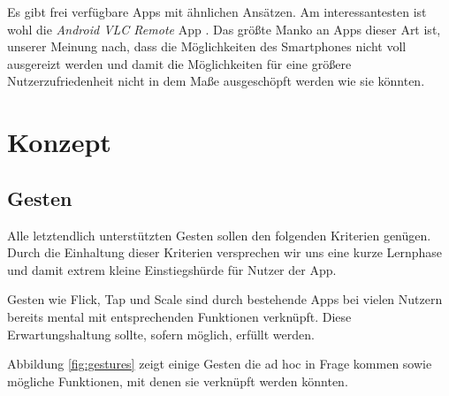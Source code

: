 \documentclass[a4paper,12pt]{article}
\begin{document}
Es gibt frei verfügbare Apps mit ähnlichen Ansätzen. Am interessantesten ist wohl die \textit{Android VLC Remote} App \cite{android-vlc-remote}. Das größte Manko an Apps dieser Art ist, unserer Meinung nach, dass die Möglichkeiten des Smartphones nicht voll ausgereizt werden und damit die Möglichkeiten für eine größere Nutzerzufriedenheit nicht in dem Maße ausgeschöpft werden wie sie könnten.

\newpage
\section{Konzept}

\subsection{Gesten}
Alle letztendlich unterstützten Gesten sollen den folgenden Kriterien genügen. Durch die Einhaltung dieser Kriterien versprechen wir uns eine kurze Lernphase und damit extrem kleine Einstiegshürde für Nutzer der App. \newline

Gesten wie Flick, Tap und Scale sind durch bestehende Apps bei vielen Nutzern bereits mental mit entsprechenden Funktionen verknüpft. Diese Erwartungshaltung sollte, sofern möglich, erfüllt werden.

Abbildung \ref{fig:gestures} zeigt einige Gesten die ad hoc in Frage kommen sowie mögliche Funktionen, mit denen sie verknüpft werden könnten.
\end{document}
